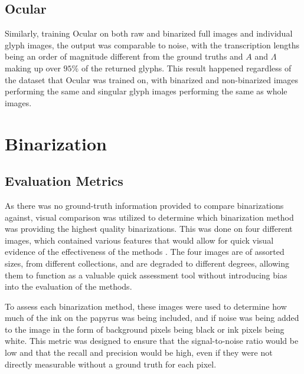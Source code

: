\subsection{Ocular}

Similarly, training Ocular on both raw and binarized full images and individual glyph images, the output was comparable to noise, with the transcription lengths being an order of magnitude different from the ground truths and $A$ and $\Lambda$ making up over $95\%$ of the returned glyphs. This result happened regardless of the dataset that Ocular was trained on, with binarized and non-binarized images performing the same and singular glyph images performing the same as whole images.

\section{Binarization}

\subsection{Evaluation Metrics}

As there was no ground-truth information provided to compare binarizations against, visual comparison was utilized to determine which binarization method was providing the highest quality binarizations. This was done on four different images, which contained various features that would allow for quick visual evidence of the effectiveness of the methods . The four images are of assorted sizes, from different collections, and are degraded to different degrees, allowing them to function as a valuable quick assessment tool without introducing bias into the evaluation of the methods.

To assess each binarization method, these images were used to determine how much of the ink on the papyrus was being included, and if noise was being added to the image in the form of background pixels being black or ink pixels being white. This metric was designed to ensure that the signal-to-noise ratio would be low and that the recall and precision would be high, even if they were not directly measurable without a ground truth for each pixel.

